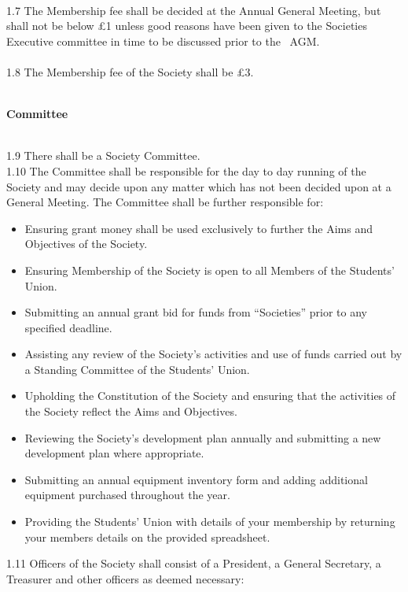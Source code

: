 \documentclass[a4paper,twoside,notitlepage,11pt]{article}
\newcommand{\consHead}[1]{\begin{Large}\textbf{#1}\end{Large}\ \\}
\begin{document}
\ \\
1.7 The Membership fee shall be decided at the Annual General Meeting, but shall not be below \pounds 1 unless good reasons have been given to the Societies Executive committee in time to be discussed prior to the \ AGM.\ \\
\ \\
1.8 The Membership fee of the Society shall be \pounds 3.
\ \\
\ \\
\consHead{Committee}
1.9 There shall be a Society Committee.\ \\
\newpage
{}
1.10 The Committee shall be responsible for the day to day running of the Society and may decide upon any matter which has not been decided upon at a General Meeting. The Committee shall be further responsible for:
\begin{itemize}
	\item Ensuring grant money shall be used exclusively to further the Aims and Objectives of the Society.
	\item Ensuring Membership of the Society is open to all Members of the Students' Union.
	\item Submitting an annual grant bid for funds from ``Societies'' prior to any specified deadline.
	\item Assisting any review of the Society's activities and use of funds carried out by a Standing Committee of the Students' Union.
	\item Upholding the Constitution of the Society and ensuring that the activities of the Society reflect the Aims and Objectives.
	\item Reviewing the Society's development plan annually and submitting a new development plan where appropriate.
	\item Submitting an annual equipment inventory form and adding additional equipment purchased throughout the year.
	\item Providing the Students' Union with details of your membership by returning your members details on the provided spreadsheet.
\end{itemize}
1.11 Officers of the Society shall consist of a President, a General Secretary, a Treasurer and other officers as deemed necessary:
\end{document}
